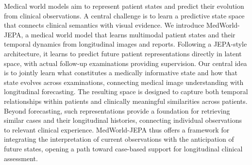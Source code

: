 Medical world models aim to represent patient states and predict their evolution from clinical observations. A central challenge is to learn a predictive state space that connects clinical semantics with visual evidence. We introduce MedWorld-JEPA, a medical world model that learns multimodal patient states and their temporal dynamics from longitudinal images and reports. Following a JEPA-style architecture, it learns to predict future patient representations directly in latent space, with actual follow-up examinations providing supervision. Our central idea is to jointly learn what constitutes a medically informative state and how that state evolves across examinations, connecting medical image understanding with longitudinal forecasting. The resulting space is designed to capture both temporal relationships within patients and clinically meaningful similarities across patients. Beyond forecasting, such representations provide a foundation for retrieving similar cases and their longitudinal histories, connecting individual observations to relevant clinical experience. MedWorld-JEPA thus offers a framework for integrating the interpretation of current observations with the anticipation of future states, opening a path toward case-based support for longitudinal clinical assessment.
